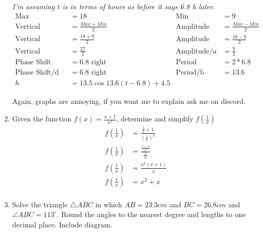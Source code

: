 \documentclass[paper=a4, fontsize=11pt]{scrartcl}
\begin{document}
\begin{enumerate}[resume]
    \textit{I'm assuming $t$ is in terms of hours as before it says 6.8 h later}.
    \begin{align*}
        \text{Max}&= 18&\text{Min}&=9\\
        \text{Vertical Displacement}&=\frac{Max+Min}{2}&\text{Amplitude}&=\frac{Max-Min}{2}\\
        \text{Vertical Displacement}&=\frac{18+9}{2}&\text{Amplitude}&=\frac{18-9}{2}\\
        \text{Vertical Displacement/c}&=\frac{27}{2}&\text{Amplitude/a}&=\frac{9}{2}\\
        \text{Phase Shift}&=6.8\text{ right}&\text{Period}&=2*6.8\\
        \text{Phase Shift/d}&=6.8\text{ right}&\text{Period/b}&=13.6\\
        h&=13.5\cos 13.6(t-6.8)+4.5
    \end{align*}
    \begin{center}
        Again, graphs are annoying, if you want me to explain ask me on discord.
    \end{center}
    \item Given the function $f(x)=\frac{x+1}{x^2}$, determine and simplify $f(\frac{1}{x})$
    \begin{align*}
        f(\frac{1}{x})&=\frac{\frac{1}{x}+1}{(\frac{1}{x})^2}\\
        f(\frac{1}{x})&=\frac{\frac{1+x}{x}}{\frac{1}{x^2}}\\
        f(\frac{1}{x})&=\frac{x^2(x+1)}{x}\\
        f(\frac{1}{x})&=x^2+x\\
    \end{align*}
    \item Solve the triangle $\triangle ABC$ in which $AB=23.3cm$ and $BC=26.8cm$ and $\angle ABC=113^\circ$. Round the angles to the nearest degree and lengths to one decimal place. Include diagram.
    

\end{enumerate}
\end{document}
